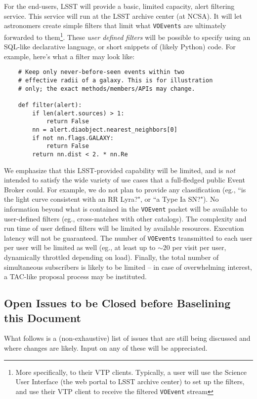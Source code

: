 \documentclass[12pt]{article}
\newcommand{\code}[1]{\texttt{#1}}
\newcommand{\VOEvent}{\code{VOEvent}\xspace}
\newcommand{\VOEvents}{\code{VOEvents}\xspace}
\begin{document}
For the end-users, LSST will provide a basic, limited capacity, alert filtering service. This service will run at the LSST archive center (at NCSA). It will let astronomers create simple filters that limit what \VOEvents are ultimately forwarded to them\footnote{More specifically, to their VTP clients. Typically, a user will use the Science User Interface (the web portal to LSST archive center) to set up the filters, and use their VTP client to receive the filtered \VOEvent stream}. These {\em user defined filters} will be possible to specify using an SQL-like declarative language, or short snippets of (likely Python) code. For example, here's what a filter may look like:
\begin{verbatim}
    # Keep only never-before-seen events within two
    # effective radii of a galaxy. This is for illustration 
    # only; the exact methods/members/APIs may change.
    
    def filter(alert):
        if len(alert.sources) > 1:
            return False
        nn = alert.diaobject.nearest_neighbors[0]
        if not nn.flags.GALAXY:
            return False
        return nn.dist < 2. * nn.Re
\end{verbatim}

We emphasize that this LSST-provided capability will be limited, and is {\em not} intended to satisfy the wide variety of use cases that a full-fledged public Event Broker could. For example, we do not plan to provide any classification (eg., ``is the light curve consistent with an RR Lyra?", or ``a Type Ia SN?"). No information beyond what is contained in the \VOEvent packet will be available to user-defined filters (eg., cross-matches with other catalogs). The complexity and run time of user defined filters will be limited by available resources. Execution latency will not be guaranteed. The number of \VOEvents transmitted to each user per user will be limited as well (eg., at least up to $\sim 20$ per visit per user, dynamically throttled depending on load). Finally, the total number of simultaneous subscribers is likely to be limited -- in case of overwhelming interest, a TAC-like proposal process may be instituted.

\subsection{Open Issues to be Closed before Baselining this Document}

What follows is a (non-exhaustive) list of issues that are still being discussed and where changes are likely. Input on any of these will be appreciated.
\end{document}
